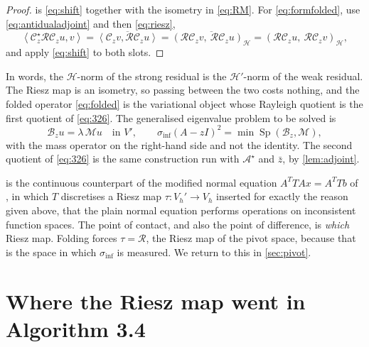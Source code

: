 \documentclass[11pt,a4paper]{article}
\theoremstyle{plain}
\newcommand{\dual}[2]{\left\langle #1, #2 \right\rangle}
\newcommand{\Hb}{\mathcal{H}}
\newcommand{\Vb}{V}
\newcommand{\Aop}{\mathcal{A}}
\newcommand{\Bop}{\mathcal{B}}
\newcommand{\spec}{\sigma}
\DeclareMathOperator{\Sp}{Sp}
\newcommand{\siginf}{\spec_{\inf}}
\newcommand{\adj}{\star}                 %
\newcommand{\Riesz}{\mathcal{R}}         %
\newcommand{\Mass}{\mathcal{M}}          %
\begin{document}
\begin{proof}
   is \cref{eq:shift} together with the isometry in
  \cref{eq:RM}.  For \cref{eq:formfolded}, use \cref{eq:antidualadjoint} and
  then \cref{eq:riesz},
  \[
    \dual{\mathcal{C}_z^{\adj}\Riesz\mathcal{C}_z u}{v}
      = \overline{\dual{\mathcal{C}_z v}{\Riesz \mathcal{C}_z u}}
      = \overline{(\Riesz\mathcal{C}_z v,\ \Riesz \mathcal{C}_z u)_{\Hb}}
      = (\Riesz\mathcal{C}_z u,\ \Riesz \mathcal{C}_z v)_{\Hb},
  \]
  and apply \cref{eq:shift} to both slots.
\end{proof}

In words, the $\Hb$-norm of the strong residual is the $\Hb'$-norm of the weak
residual.  The Riesz map is an isometry, so passing between the two costs
nothing, and the folded operator \cref{eq:folded} is the variational object
whose Rayleigh quotient is the first quotient of \cref{eq:326}.  The generalised
eigenvalue problem to be solved is
\begin{equation}
  \label{eq:pencil}
  \Bop_z u = \lambda\, \Mass u \quad \text{in } \Vb' ,
  \qquad \siginf(A - zI)^2 = \min \Sp(\Bop_z, \Mass),
\end{equation}
with the mass operator on the right-hand side and not the identity.  The second
quotient of \cref{eq:326} is the same construction run with $\Aop^{\adj}$ and
$\bar z$, by \cref{lem:adjoint}.

\begin{remark}
  \label{rem:lnz}
   is the continuous counterpart of the modified normal equation
  $A^{T}TAx = A^{T}Tb$ of
  \cite[Equation~(3.7)]{LazzarinoNakatsukasaZerbinati2026}, in which $T$
  discretises a Riesz map $\tau \colon \Vb_h' \to \Vb_h$ inserted for exactly
  the reason given above, that the plain normal equation performs operations on
  inconsistent function spaces.  The point of contact, and also the point of
  difference, is \emph{which} Riesz map.  Folding forces $\tau = \Riesz$, the
  Riesz map of the pivot space, because that is the space in which
  $\siginf$ is measured.  We return to this in \cref{sec:pivot}.
\end{remark}

\section{Where the Riesz map went in Algorithm 3.4}
\label{sec:gram}
\end{document}
